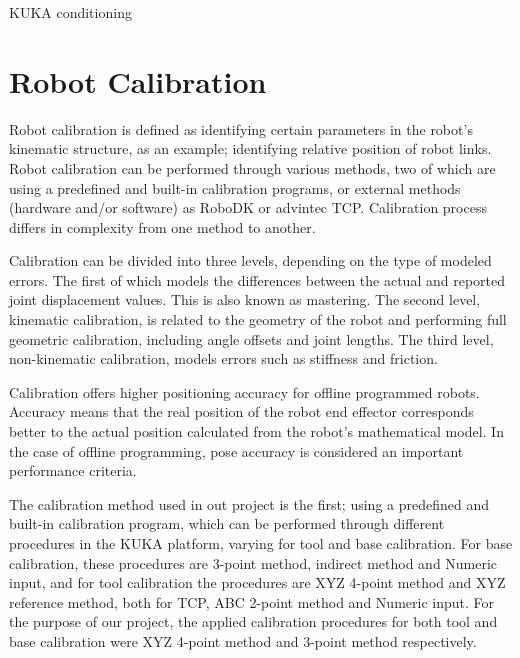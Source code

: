 \documentclass{book}
\begin{document}
\begin{chapter}{KUKA conditioning}
	\newpage		
	\section{Robot Calibration}
	Robot calibration is defined as identifying certain parameters in the robot’s kinematic structure, as an example; identifying relative position of robot links. Robot calibration can be performed through various methods, two of which are using a predefined and built-in calibration programs, or external methods (hardware and/or software) as RoboDK or advintec TCP. Calibration process differs in complexity from one method to another. 

	Calibration can be divided into three levels, depending on the type of modeled errors. The first of which models the differences between the actual and reported joint displacement values. This is also known as mastering. The second level, kinematic calibration, is related to the geometry of the robot and performing full geometric calibration, including angle offsets and joint lengths. The third level, non-kinematic calibration, models errors such as stiffness and friction.

	Calibration offers higher positioning accuracy for offline programmed robots. Accuracy means that the real position of the robot end effector corresponds better to the actual position calculated from the robot’s mathematical model. In the case of offline programming, pose accuracy is considered an important performance criteria.
		
	The calibration method used in out project is the first; using a predefined and built-in calibration program, which can be performed through different procedures in the KUKA platform, varying for tool and base calibration. For base calibration, these procedures are 3-point method, indirect method and Numeric input, and for tool calibration the procedures are XYZ 4-point method and XYZ reference method, both for TCP, ABC 2-point method and Numeric input. For the purpose of our project, the applied calibration procedures for both tool and base calibration were XYZ 4-point method and 3-point method respectively.
		

\end{chapter}
\end{document}
